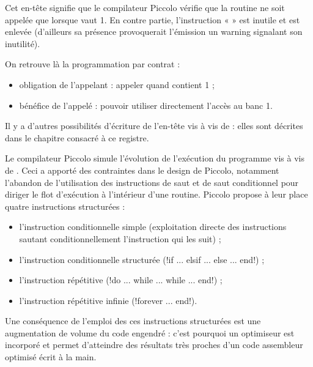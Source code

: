 Cet en-tête signifie que le compilateur Piccolo vérifie que la routine ne soit appelée que lorsque  vaut 1. En contre partie, l’instruction «  » est inutile et est enlevée (d’ailleurs sa présence provoquerait l’émission un warning signalant son inutilité).

On retrouve là la programmation par contrat :
\begin{itemize}
  \item obligation de l’appelant : appeler  quand  contient 1 ;
  \item bénéfice de l’appelé : pouvoir utiliser directement l’accès au banc 1. 
\end{itemize}

Il y a d’autres possibilités d’écriture de l’en-tête vis à vis de  : elles sont décrites dans le chapitre consacré à ce registre.

Le compilateur Piccolo simule l’évolution de l’exécution du programme vis à vis de . Ceci a apporté des contraintes dans le design de Piccolo, notamment l’abandon de l’utilisation des instructions de saut et de saut conditionnel pour diriger le flot d’exécution à l’intérieur d’une routine. Piccolo propose à leur place quatre instructions structurées :
\begin{itemize}
  \item l’instruction conditionnelle simple (exploitation directe des instructions sautant conditionnellement l’instruction qui les suit) ;
  \item l’instruction conditionnelle structurée (\pic!if ... elsif ... else ... end!) ;
  \item l’instruction répétitive (\pic!do ... while ... while ... end!) ;
  \item l’instruction répétitive infinie (\pic!forever ... end!).
\end{itemize}

Une conséquence de l’emploi des ces instructions structurées est une augmentation de volume du code engendré : c’est pourquoi un optimiseur est incorporé et permet d’atteindre des résultats très proches d’un code assembleur optimisé écrit à la main.

